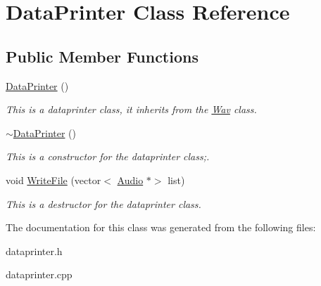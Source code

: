 \hypertarget{classDataPrinter}{}\section{Data\+Printer Class Reference}
\label{classDataPrinter}
\subsection*{Public Member Functions}
\begin{DoxyCompactItemize}
\item 
\mbox{\label{classDataPrinter_a1f7a2bfb3f337cfd86bae5f37f3d91bb}} 
\hyperlink{classDataPrinter_a1f7a2bfb3f337cfd86bae5f37f3d91bb}{Data\+Printer} ()
\begin{DoxyCompactList}\small\item\em This is a dataprinter class, it inherits from the \hyperlink{classWav}{Wav} class. \end{DoxyCompactList}\item 
\mbox{\label{classDataPrinter_a4e134770745823d0b302d5adfdf44893}} 
\hyperlink{classDataPrinter_a4e134770745823d0b302d5adfdf44893}{$\sim$\+Data\+Printer} ()
\begin{DoxyCompactList}\small\item\em This is a constructor for the dataprinter class;. \end{DoxyCompactList}\item 
\mbox{\label{classDataPrinter_ae8950a33a94eb2f0685cefd137df894d}} 
void \hyperlink{classDataPrinter_ae8950a33a94eb2f0685cefd137df894d}{Write\+File} (vector$<$ \hyperlink{classAudio}{Audio} $\ast$$>$ list)
\begin{DoxyCompactList}\small\item\em This is a destructor for the dataprinter class. \end{DoxyCompactList}\end{DoxyCompactItemize}


The documentation for this class was generated from the following files\+:\begin{DoxyCompactItemize}
\item 
dataprinter.\+h\item 
dataprinter.\+cpp\end{DoxyCompactItemize}
